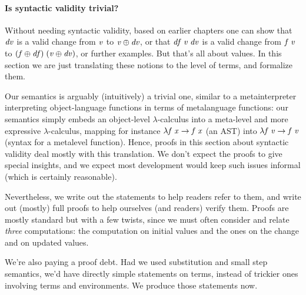 \paragraph{Is syntactic validity trivial?}
Without needing syntactic validity, based on earlier chapters one
can show that
\ensuremath{\Varid{dv}} is a valid change from \ensuremath{\Varid{v}} to \ensuremath{\Varid{v}\oplus \Varid{dv}}, or that \ensuremath{\Varid{df}\;\Varid{v}\;\Varid{dv}} is a valid change from \ensuremath{\Varid{f}\;\Varid{v}} to \ensuremath{(\Varid{f}\oplus \Varid{df})\;(\Varid{v}\oplus \Varid{dv})}, or further examples.
But that's all about values. In this section we are just translating these
notions to the level of terms, and formalize them.

Our semantics is arguably (intuitively) a trivial one, similar to
a metainterpreter interpreting object-language functions in terms of
metalanguage functions: our semantics simply embeds an
object-level $\lambda$-calculus into a meta-level and more
expressive $\lambda$-calculus, mapping for instance \ensuremath{\lambda \Varid{f}\;\Varid{x}\to \Varid{f}\;\Varid{x}}
(an AST) into \ensuremath{\lambda \Varid{f}\;\Varid{v}\to \Varid{f}\;\Varid{v}} (syntax for a metalevel function).
Hence, proofs in this section about syntactic validity deal
mostly with this translation. We don't expect the proofs to give
special insights, and we expect most development would keep such
issues informal (which is certainly reasonable).

Nevertheless, we write out the statements to help readers refer
to them, and write out (mostly) full proofs to help ourselves
(and readers) verify them. Proofs are mostly standard but
with a few twists, since we must often consider and relate
\emph{three} computations: the computation on initial values and
the ones on the change and on updated values.

We're also paying a proof debt. Had we used substitution and
small step semantics, we'd have directly simple statements on terms,
instead of trickier ones involving terms and environments. We
produce those statements now.

